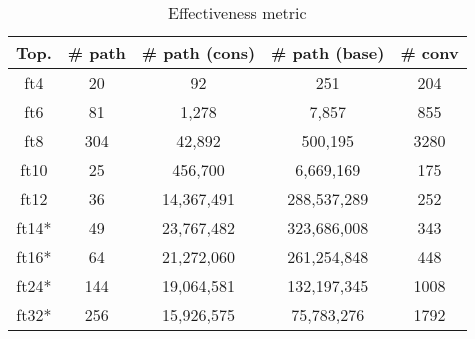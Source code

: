 \begin{table}[h]
    \begin{tabular}{| c | c | c | c | c |}
        \hline
        Top. & \# path & \# path (cons) & \# path (base) & \# conv \\
        \hline
        ft4 & 20 & 92 & 251 & 204 \\
        ft6 & 81 & 1,278 & 7,857 & 855 \\
        ft8 & 304 & 42,892 & 500,195 & 3280 \\
        ft10 & 25 & 456,700 & 6,669,169 & 175 \\
        ft12 & 36 & 14,367,491 & 288,537,289 & 252 \\
        ft14* & 49 & 23,767,482 & 323,686,008 & 343 \\
        ft16* & 64 & 21,272,060 & 261,254,848 & 448 \\
        ft24* & 144 & 19,064,581 & 132,197,345 & 1008 \\
        ft32* & 256 & 15,926,575 & 75,783,276 & 1792 \\
        \hline
    \end{tabular}
    \caption{Effectiveness metric}
    \label{tab:analysis}
\end{table}